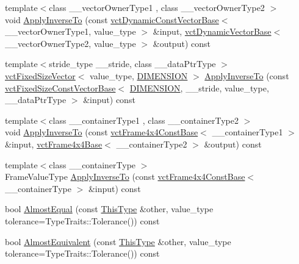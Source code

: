 \begin{DoxyCompactItemize}
\item 
{\footnotesize template$<$class \+\_\+\+\_\+vector\+Owner\+Type1 , class \+\_\+\+\_\+vector\+Owner\+Type2 $>$ }\\void \hyperlink{classvct_frame4x4_const_base_aab05656b39bd5a81b380f6aeb7155106}{Apply\+Inverse\+To} (const \hyperlink{classvct_dynamic_const_vector_base}{vct\+Dynamic\+Const\+Vector\+Base}$<$ \+\_\+\+\_\+vector\+Owner\+Type1, value\+\_\+type $>$ \&input, \hyperlink{classvct_dynamic_vector_base}{vct\+Dynamic\+Vector\+Base}$<$ \+\_\+\+\_\+vector\+Owner\+Type2, value\+\_\+type $>$ \&output) const 
\item 
{\footnotesize template$<$stride\+\_\+type \+\_\+\+\_\+stride, class \+\_\+\+\_\+data\+Ptr\+Type $>$ }\\\hyperlink{classvct_fixed_size_vector}{vct\+Fixed\+Size\+Vector}$<$ value\+\_\+type, \hyperlink{classvct_frame4x4_const_base_aa9000d4539e9ab27b091692d4bd0d986a97d7212e6c46dc9acbbd11bbc573d9a0}{D\+I\+M\+E\+N\+S\+I\+O\+N} $>$ \hyperlink{classvct_frame4x4_const_base_afad69572e81f133c73c3c2ebf12e5189}{Apply\+Inverse\+To} (const \hyperlink{classvct_fixed_size_const_vector_base}{vct\+Fixed\+Size\+Const\+Vector\+Base}$<$ \hyperlink{classvct_frame4x4_const_base_aa9000d4539e9ab27b091692d4bd0d986a97d7212e6c46dc9acbbd11bbc573d9a0}{D\+I\+M\+E\+N\+S\+I\+O\+N}, \+\_\+\+\_\+stride, value\+\_\+type, \+\_\+\+\_\+data\+Ptr\+Type $>$ \&input) const 
\item 
{\footnotesize template$<$class \+\_\+\+\_\+container\+Type1 , class \+\_\+\+\_\+container\+Type2 $>$ }\\void \hyperlink{classvct_frame4x4_const_base_a1a1a408b9d5d40ddbd922c7e88d301de}{Apply\+Inverse\+To} (const \hyperlink{classvct_frame4x4_const_base}{vct\+Frame4x4\+Const\+Base}$<$ \+\_\+\+\_\+container\+Type1 $>$ \&input, \hyperlink{classvct_frame4x4_base}{vct\+Frame4x4\+Base}$<$ \+\_\+\+\_\+container\+Type2 $>$ \&output) const 
\item 
{\footnotesize template$<$class \+\_\+\+\_\+container\+Type $>$ }\\Frame\+Value\+Type \hyperlink{classvct_frame4x4_const_base_ac0efcdba37b56fd276148ddff72a84f0}{Apply\+Inverse\+To} (const \hyperlink{classvct_frame4x4_const_base}{vct\+Frame4x4\+Const\+Base}$<$ \+\_\+\+\_\+container\+Type $>$ \&input) const 
\item 
bool \hyperlink{classvct_frame4x4_const_base_a232d5b0f78d1f59acaa99acf5ff48d33}{Almost\+Equal} (const \hyperlink{classvct_frame4x4_const_base_acb37107e49c20bd15139ff196aff1087}{This\+Type} \&other, value\+\_\+type tolerance=Type\+Traits\+::\+Tolerance()) const 
\item 
bool \hyperlink{classvct_frame4x4_const_base_aeb1226096b5e7b1dacd675406a8637e3}{Almost\+Equivalent} (const \hyperlink{classvct_frame4x4_const_base_acb37107e49c20bd15139ff196aff1087}{This\+Type} \&other, value\+\_\+type tolerance=Type\+Traits\+::\+Tolerance()) const 
\end{DoxyCompactItemize}
